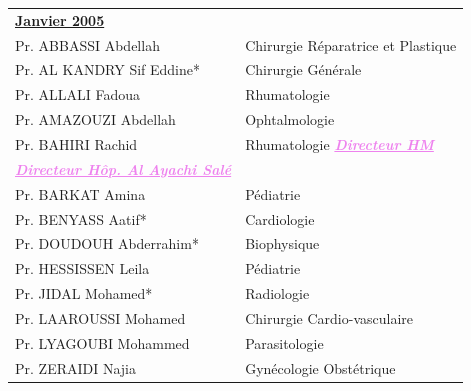   \begin{table}[H]

    \begin{tabular}{l l}
     \multicolumn{2}{l}{\textbf{\underline{Janvier 2005}}}\vspace*{0.5em}\\
     Pr. ABBASSI Abdellah & \hspace*{2em} Chirurgie Réparatrice et Plastique\\
     Pr. AL KANDRY Sif Eddine* & \hspace*{2em} Chirurgie Générale \\
     Pr. ALLALI Fadoua & \hspace*{2em} Rhumatologie\\
     Pr. AMAZOUZI Abdellah	& \hspace*{2em} Ophtalmologie \\
     Pr. BAHIRI Rachid & \hspace*{2em} Rhumatologie \textcolor{violet}{\textbf{\emph{\underline{Directeur HM }}}}  \\
     \textcolor{violet}{\textbf{\emph{\underline{Directeur Hôp. Al Ayachi Salé}}}}\\
     Pr. BARKAT Amina &  \hspace*{2em} Pédiatrie\\
     Pr. BENYASS Aatif* &  \hspace*{2em} Cardiologie\\
     Pr. DOUDOUH Abderrahim*	& \hspace*{2em} Biophysique\\
     Pr. HESSISSEN Leila	& \hspace*{2em} Pédiatrie \\
     Pr. JIDAL Mohamed*	& \hspace*{2em} Radiologie \\
     Pr. LAAROUSSI Mohamed	& \hspace*{2em} Chirurgie Cardio-vasculaire \\
     Pr. LYAGOUBI Mohammed	& \hspace*{2em} Parasitologie \\
     Pr. ZERAIDI Najia & \hspace*{2em} Gynécologie Obstétrique \\

    \end{tabular}
    
    \end{table}

